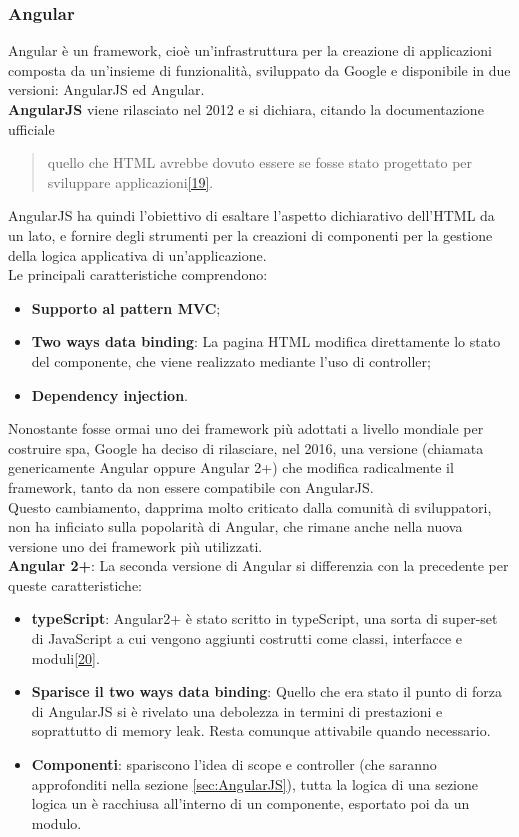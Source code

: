 \subsubsection{Angular}
Angular è un framework, cioè un'infrastruttura per la creazione di applicazioni composta da un'insieme di funzionalità, sviluppato da Google e disponibile in due versioni: AngularJS ed Angular.\\
\textbf{AngularJS} viene rilasciato nel 2012 e si dichiara, citando la documentazione ufficiale 
\begin{quote}
quello che HTML avrebbe dovuto essere se fosse stato progettato per sviluppare applicazioni\hyperlink{19}{[19]}.
\end{quote}  %
AngularJS ha quindi l'obiettivo di esaltare l'aspetto dichiarativo dell'HTML da un lato, e fornire degli strumenti per la creazioni di componenti per la gestione della logica applicativa di un'applicazione.\\
Le principali caratteristiche comprendono:
\begin{itemize}
	\item \textbf{Supporto al pattern MVC};
	\item \textbf{Two ways data binding}: La pagina HTML modifica direttamente lo stato del componente, che viene realizzato mediante l'uso di controller;
	\item \textbf{Dependency injection}. %
\end{itemize}
Nonostante fosse ormai uno dei \gls{framework} più adottati a livello mondiale per costruire \gls{spa}\glsfirstoccur, Google ha deciso di rilasciare, nel 2016, una versione (chiamata genericamente Angular oppure Angular 2+) che modifica radicalmente il \gls{framework}, tanto da non essere compatibile con AngularJS.\\
Questo cambiamento, dapprima molto criticato dalla comunità di sviluppatori, non ha inficiato sulla popolarità di Angular, che rimane anche nella nuova versione uno dei \gls{framework} più utilizzati.\\
\textbf{Angular 2+}: La seconda versione di Angular si differenzia con la precedente per queste caratteristiche:
\begin{itemize}
	\item \textbf{typeScript}: Angular2+ è stato scritto in typeScript, una sorta di super-set di JavaScript a cui vengono aggiunti costrutti come classi, interfacce e moduli\hyperlink{20}{[20]}.
	\item \textbf{Sparisce il two ways data binding}: Quello che era stato il punto di forza di AngularJS si è rivelato una debolezza in termini di prestazioni e soprattutto di memory leak. Resta comunque attivabile quando necessario.
	\item \textbf{Componenti}: spariscono l'idea di scope e controller (che saranno approfonditi nella sezione \ref{sec:AngularJS}), tutta la logica di una sezione logica un è racchiusa all'interno di un componente, esportato poi da un modulo. %
\end{itemize}
